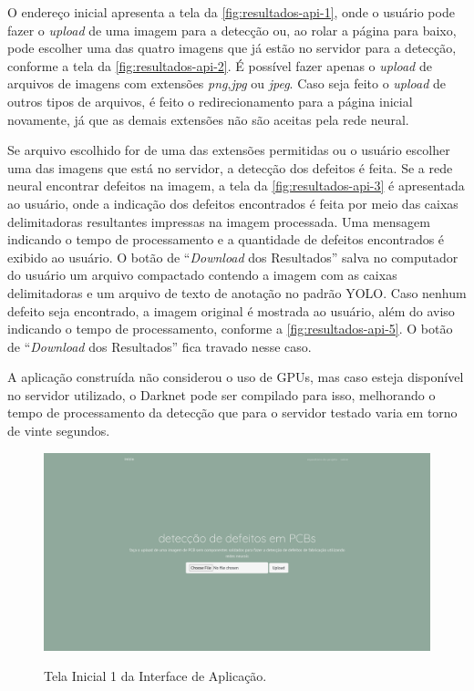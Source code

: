 \begin{figure}[H]
  \label{fig:resultados-api-etapas}
\end{figure}

O endereço inicial apresenta a tela da \autoref{fig:resultados-api-1}, onde o usuário pode fazer o \textit{upload} de uma imagem para a detecção ou, ao rolar a página para baixo, pode escolher uma das quatro imagens que já estão no servidor para a detecção, conforme a tela da \autoref{fig:resultados-api-2}. É possível fazer apenas o \textit{upload} de arquivos de imagens com extensões \textit{png},\textit{jpg} ou \textit{jpeg}. Caso seja feito o \textit{upload} de outros tipos de arquivos, é feito o redirecionamento para a página inicial novamente, já que as demais extensões não são aceitas pela rede neural.

Se arquivo escolhido for de uma das extensões permitidas ou o usuário escolher uma das imagens que está no servidor, a detecção dos defeitos é feita. Se a rede neural encontrar defeitos na imagem, a tela da \autoref{fig:resultados-api-3} é apresentada ao usuário, onde a indicação dos defeitos encontrados é feita por meio das caixas delimitadoras resultantes impressas na imagem processada. Uma mensagem indicando o tempo de processamento e a quantidade de defeitos encontrados é exibido ao usuário. O botão de ``\textit{Download} dos Resultados'' salva no computador do usuário um arquivo compactado contendo a imagem com as caixas delimitadoras e um arquivo de texto de anotação no padrão YOLO. Caso nenhum defeito seja encontrado, a imagem original é mostrada ao usuário, além do aviso indicando o tempo de processamento, conforme a \autoref{fig:resultados-api-5}. O botão de ``\textit{Download} dos Resultados'' fica travado nesse caso.

A aplicação construída não considerou o uso de GPUs, mas caso esteja disponível no servidor utilizado, o Darknet pode ser compilado para isso, melhorando o tempo de processamento da detecção que para o servidor testado varia em torno de vinte segundos.

\begin{landscape}
  \begin{figure}[H] %
    \centering
    \caption{Tela Inicial 1 da Interface de Aplicação.}
    \includegraphics[scale=0.36]{img/api/1.png}
    \label{fig:resultados-api-1}
  \end{figure}
\end{landscape}

